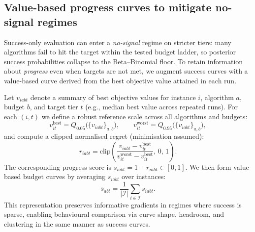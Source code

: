 \subsection{{Value-based progress curves to mitigate no-signal regimes}}
\label{{subsec:value_based_curves}}

Success-only evaluation can enter a \emph{{no-signal}} regime on stricter tiers: many algorithms fail to hit the
target within the tested budget ladder, so posterior success probabilities collapse to the Beta--Binomial floor.
To retain information about \emph{{progress}} even when targets are not met, we augment success curves with a
value-based curve derived from the best objective value attained in each run.

Let $v_{{iabt}}$ denote a summary of best objective values for instance $i$, algorithm $a$, budget $b$, and target tier $t$
(e.g., median best value across repeated runs). For each $(i,t)$ we define a robust reference scale across all algorithms and budgets:
\[
v_{{it}}^{{\mathrm{{best}}}} = Q_{{0.05}}\big(\{{v_{{iabt}}\}}_{{a,b}}\big), \qquad
v_{{it}}^{{\mathrm{{worst}}}} = Q_{{0.95}}\big(\{{v_{{iabt}}\}}_{{a,b}}\big),
\]
and compute a clipped normalised regret (minimisation assumed):
\[
r_{{iabt}} = \mathrm{{clip}}\!\left(\frac{{v_{{iabt}} - v_{{it}}^{{\mathrm{{best}}}}}}{{v_{{it}}^{{\mathrm{{worst}}}} - v_{{it}}^{{\mathrm{{best}}}}}},\,0,\,1\right).
\]
The corresponding progress score is $s_{{iabt}} = 1 - r_{{iabt}} \in [0,1]$.
We then form value-based budget curves by averaging $s_{{iabt}}$ over instances:
\[
\bar s_{{abt}} = \frac{1}{|\mathcal{{I}}|}\sum_{{i\in\mathcal{{I}}}} s_{{iabt}}.
\]
This representation preserves informative gradients in regimes where success is sparse, enabling
behavioural comparison via curve shape, headroom, and clustering in the same manner as success curves.
